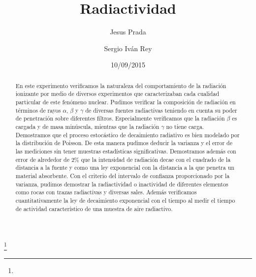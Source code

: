 \documentclass[%
 reprint,
 amsmath,amssymb,
 aps,
]{revtex4-1}
\begin{document}

\title{Radiactividad}%
\thanks{}%

\author{Jesus Prada}
\author{Sergio Iv\'an Rey}%
%

\date{10/09/2015}%

\begin{abstract}
En este experimento verificamos la naturaleza del comportamiento de la radiación ionizante por medio de diversos experimentos que caracterizaban cada cualidad particular de este fenómeno nuclear. Pudimos verificar la composición de radiación en términos de rayos $\alpha$, $\beta$ y $\gamma$ de diversas fuentes radiactivas teniendo en cuenta su poder de penetración sobre diferentes filtros. Especialmente verificamos que la radiación $\beta$ es cargada y de masa minúscula, mientras que la radiación $\gamma$ no tiene carga. Demostramos que el proceso estocástico de decaimiento radiativo es bien modelado por la distribución de Poisson. De esta manera pudimos deducir la varianza y el error de las mediciones sin tener muestras estadísticas significativas. Demostramos además con error de alrededor de 2\% que la intensidad de radiación decae con el cuadrado de la distancia a la fuente y como una ley exponencial con la distancia a la que penetra un material absorbente. Con el criterio del intervalo de confianza proporcionado por la varianza, pudimos demostrar la radiactividad o inactividad de diferentes elementos como rocas con trazas radiactivas y diversas sales. Además verificamos cuantitativamente la ley de decaimiento exponencial con el tiempo al medir el tiempo de actividad característico de una muestra de aire radiactivo.
\end{abstract}


\keywords{}%
\maketitle

\end{document}
